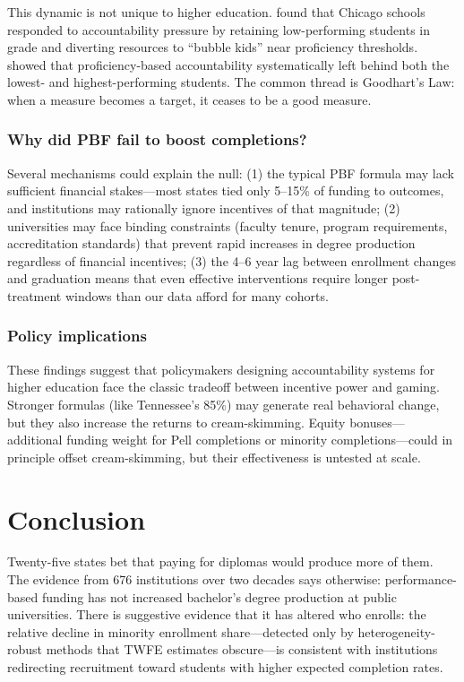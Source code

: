 \documentclass[12pt]{article}
\begin{document}
This dynamic is not unique to higher education. \citet{jacob2005accountability} found that Chicago schools responded to accountability pressure by retaining low-performing students in grade and diverting resources to ``bubble kids'' near proficiency thresholds. \citet{neal2010left} showed that proficiency-based accountability systematically left behind both the lowest- and highest-performing students. The common thread is Goodhart's Law: when a measure becomes a target, it ceases to be a good measure.

\subsubsection*{Why did PBF fail to boost completions?} Several mechanisms could explain the null: (1) the typical PBF formula may lack sufficient financial stakes---most states tied only 5--15\% of funding to outcomes, and institutions may rationally ignore incentives of that magnitude; (2) universities may face binding constraints (faculty tenure, program requirements, accreditation standards) that prevent rapid increases in degree production regardless of financial incentives; (3) the 4--6 year lag between enrollment changes and graduation means that even effective interventions require longer post-treatment windows than our data afford for many cohorts.

\subsubsection*{Policy implications} These findings suggest that policymakers designing accountability systems for higher education face the classic tradeoff between incentive power and gaming. Stronger formulas (like Tennessee's 85\%) may generate real behavioral change, but they also increase the returns to cream-skimming. Equity bonuses---additional funding weight for Pell completions or minority completions---could in principle offset cream-skimming, but their effectiveness is untested at scale.

\section{Conclusion}

Twenty-five states bet that paying for diplomas would produce more of them. The evidence from 676 institutions over two decades says otherwise: performance-based funding has not increased bachelor's degree production at public universities. There is suggestive evidence that it has altered who enrolls: the relative decline in minority enrollment share---detected only by heterogeneity-robust methods that TWFE estimates obscure---is consistent with institutions redirecting recruitment toward students with higher expected completion rates.
\end{document}
